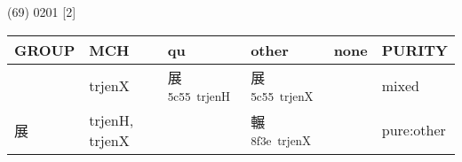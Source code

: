 \documentclass[14pt,a4paper]{scrartcl}
\begin{document}
(69) 0201 {[}2{]}

\begin{longtable}[c]{@{}llllll@{}}
\toprule
\begin{minipage}[b]{0.14\columnwidth}\raggedright\strut
GROUP
\strut\end{minipage} &
\begin{minipage}[b]{0.14\columnwidth}\raggedright\strut
MCH
\strut\end{minipage} &
\begin{minipage}[b]{0.14\columnwidth}\raggedright\strut
qu
\strut\end{minipage} &
\begin{minipage}[b]{0.14\columnwidth}\raggedright\strut
other
\strut\end{minipage} &
\begin{minipage}[b]{0.14\columnwidth}\raggedright\strut
none
\strut\end{minipage} &
\begin{minipage}[b]{0.14\columnwidth}\raggedright\strut
PURITY
\strut\end{minipage}\tabularnewline
\midrule
\endhead
\begin{minipage}[t]{0.14\columnwidth}\raggedright\strut
𧝑
\strut\end{minipage} &
\begin{minipage}[t]{0.14\columnwidth}\raggedright\strut
trjenX
\strut\end{minipage} &
\begin{minipage}[t]{0.14\columnwidth}\raggedright\strut
展\textsuperscript{5c55~trjenH}
\strut\end{minipage} &
\begin{minipage}[t]{0.14\columnwidth}\raggedright\strut
展\textsuperscript{5c55~trjenX}
\strut\end{minipage} &
\begin{minipage}[t]{0.14\columnwidth}\raggedright\strut
\strut\end{minipage} &
\begin{minipage}[t]{0.14\columnwidth}\raggedright\strut
mixed
\strut\end{minipage}\tabularnewline
\begin{minipage}[t]{0.14\columnwidth}\raggedright\strut
展
\strut\end{minipage} &
\begin{minipage}[t]{0.14\columnwidth}\raggedright\strut
trjenH, trjenX
\strut\end{minipage} &
\begin{minipage}[t]{0.14\columnwidth}\raggedright\strut
\strut\end{minipage} &
\begin{minipage}[t]{0.14\columnwidth}\raggedright\strut
輾\textsuperscript{8f3e~trjenX}
\strut\end{minipage} &
\begin{minipage}[t]{0.14\columnwidth}\raggedright\strut
\strut\end{minipage} &
\begin{minipage}[t]{0.14\columnwidth}\raggedright\strut
pure:other
\strut\end{minipage}\tabularnewline
\bottomrule
\end{longtable}
\end{document}
